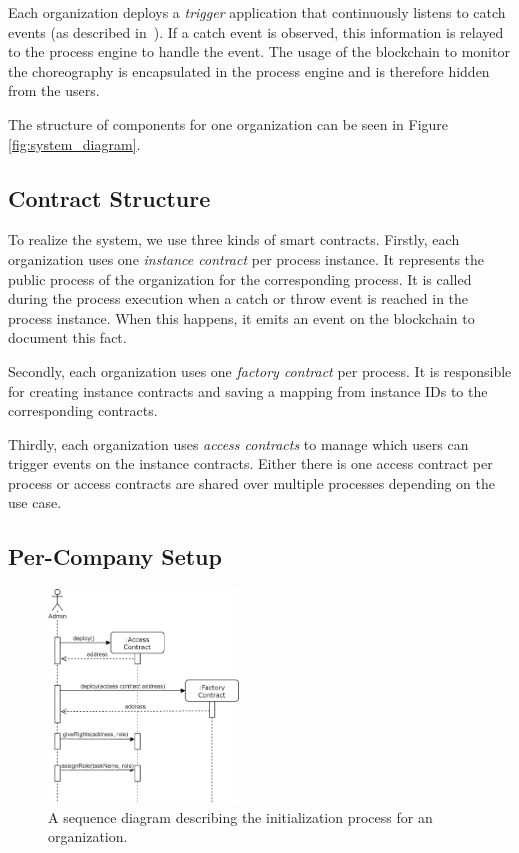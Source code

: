 \documentclass[runningheads]{llncs}
\begin{document}
Each organization deploys a \emph{trigger} application that continuously listens to catch events (as described in~\cite{weber2016untrusted}).
If a catch event is observed, this information is relayed to the process engine to handle the event.
The usage of the blockchain to monitor the choreography is encapsulated in the process engine and is therefore hidden from the users.

The structure of components for one organization can be seen in Figure \ref{fig:system_diagram}.

\subsection{Contract Structure}
To realize the system, we use three kinds of smart contracts.
Firstly, each organization uses one \emph{instance contract} per process instance.
It represents the public process of the organization for the corresponding process.
It is called during the process execution when a catch or throw event is reached in the process instance.
When this happens, it emits an event on the blockchain to document this fact.

Secondly, each organization uses one \emph{factory contract} per process.
It is responsible for creating instance contracts and saving a mapping from instance IDs to the corresponding contracts.

Thirdly, each organization uses \emph{access contracts} to manage which users can trigger events on the instance contracts.
Either there is one access contract per process or access contracts are shared over multiple processes depending on the use case.

\subsection{Per-Company Setup}
\begin{figure}
	\centering
	\includegraphics[width=0.45\textwidth]{fig/initialization.eps}
	\caption{A sequence diagram describing the initialization process for an organization.}
	\label{fig:initialization}
\end{figure}
\end{document}
